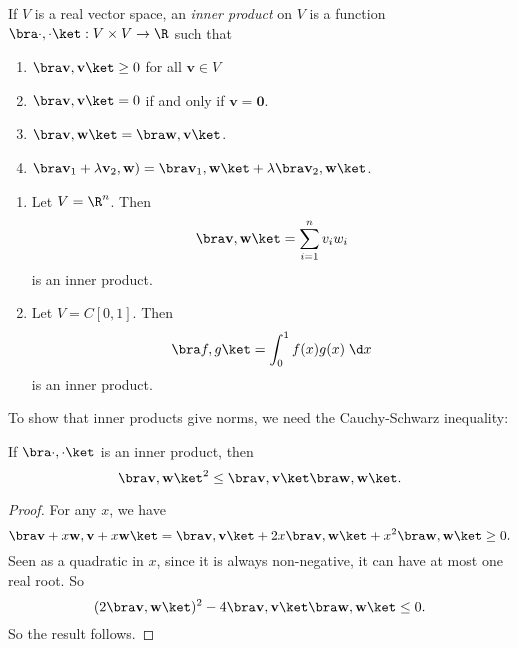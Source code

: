\documentclass[a4paper]{article}
\begin{document}
\begin{defi}
  If $V$ is a real vector space, an \emph{inner product} on $V$ is a function $\bra \cdot, \cdot\ket: V\times V \to \R$ such that
  \begin{enumerate}
    \item $\bra \mathbf{v}, \mathbf{v}\ket \geq 0$ for all $\mathbf{v}\in V$
    \item $\bra \mathbf{v}, \mathbf{v}\ket = 0$ if and only if $\mathbf{v} = \mathbf{0}$.
    \item $\bra \mathbf{v}, \mathbf{w}\ket = \bra \mathbf{w}, \mathbf{v}\ket$.
    \item $\bra \mathbf{v}_1 + \lambda \mathbf{v}_2, \mathbf{w}) = \bra \mathbf{v}_1, \mathbf{w}\ket + \lambda\bra \mathbf{v}_2 , \mathbf{w}\ket$.
  \end{enumerate}
\end{defi}

\begin{eg}\leavevmode
  \begin{enumerate}
    \item Let $V = \R^n$. Then
      \[
        \bra \mathbf{v}, \mathbf{w} \ket = \sum_{i = 1}^n v_i w_i
      \]
      is an inner product.
    \item Let $V = C[0, 1]$. Then
      \[
        \bra f, g\ket = \int_0^1 f(x) g(x) \;\d x
      \]
      is an inner product.
  \end{enumerate}
\end{eg}

To show that inner products give norms, we need the Cauchy-Schwarz inequality:

\begin{thm}
  If $\bra\cdot,\cdot\ket$ is an inner product, then
  \[
    \bra \mathbf{v}, \mathbf{w}\ket^2 \leq \bra \mathbf{v}, \mathbf{v}\ket\bra\mathbf{w},\mathbf{w}\ket.
  \]
\end{thm}

\begin{proof}
  For any $x$, we have
  \[
    \bra \mathbf{v} + x\mathbf{w}, \mathbf{v} + x \mathbf{w}\ket = \bra \mathbf{v}, \mathbf{v}\ket + 2x\bra \mathbf{v}, \mathbf{w}\ket + x^2 \bra \mathbf{w}, \mathbf{w}\ket \geq 0.
  \]
  Seen as a quadratic in $x$, since it is always non-negative, it can have at most one real root. So
  \[
    (2 \bra \mathbf{v}, \mathbf{w}\ket)^2 - 4\bra \mathbf{v}, \mathbf{v}\ket \bra \mathbf{w}, \mathbf{w}\ket \leq 0.
  \]
  So the result follows.
\end{proof}
\end{document}
